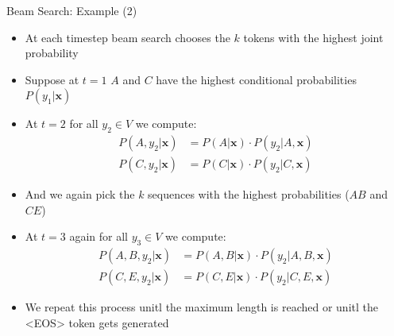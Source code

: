 \begin{vbframe}{Beam Search: Example (2)}

\vfill

\begin{itemize}
    \item At each timestep beam search chooses the $k$ tokens with the highest joint probability
    \item Suppose at $t=1$ $A$ and $C$ have the highest conditional probabilities $P(y_1|\mathbf{x})$
    \item At $t=2$ for all $y_2\in V$ we compute:
    $$
    \begin{aligned}
    P(A,y_2|\mathbf{x}) &= P(A|\mathbf{x})\cdot P(y_2|A,\mathbf{x}) \\
    P(C,y_2|\mathbf{x}) &= P(C|\mathbf{x})\cdot P(y_2|C,\mathbf{x})
    \end{aligned}
    $$
    \item And we again pick the $k$ sequences with the highest probabilities ($AB$ and $CE$)
    \item At $t=3$ again for all $y_3\in V$ we compute:
    $$
    \begin{aligned}
    P(A,B,y_2|\mathbf{x}) &= P(A,B|\mathbf{x})\cdot P(y_2|A,B,\mathbf{x}) \\
    P(C,E,y_2|\mathbf{x}) &= P(C,E|\mathbf{x})\cdot P(y_2|C,E,\mathbf{x})
    \end{aligned}
    $$
    \item We repeat this process unitl the maximum length is reached or unitl the <EOS> token gets generated
\end{itemize}

\vfill
    
\end{vbframe}



